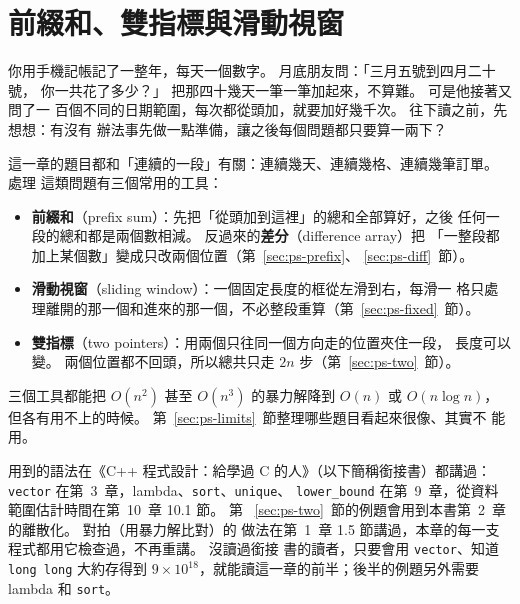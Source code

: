 \chapter{前綴和、雙指標與滑動視窗}
\label{ch:prefix}

\newcommand{\psrow}[4]{%
    \foreach \psv [count=\psi from 0] in {#3} {
        \node[#4] at ({#2 + \psi*0.9},#1) {\psv};
    }%
}

你用手機記帳記了一整年，每天一個數字。 月底朋友問：「三月五號到四月二十號，
你一共花了多少？」 把那四十幾天一筆一筆加起來，不算難。 可是他接著又問了一
百個不同的日期範圍，每次都從頭加，就要加好幾千次。 往下讀之前，先想想：有沒有
辦法事先做一點準備，讓之後每個問題都只要算一兩下？

這一章的題目都和「連續的一段」有關：連續幾天、連續幾格、連續幾筆訂單。 處理
這類問題有三個常用的工具：

\begin{itemize}
\item \textbf{前綴和}（prefix sum）：先把「從頭加到這裡」的總和全部算好，之後
任何一段的總和都是兩個數相減。 反過來的\textbf{差分}（difference array）把
「一整段都加上某個數」變成只改兩個位置（第~\ref{sec:ps-prefix}、
\ref{sec:ps-diff}~節）。
\item \textbf{滑動視窗}（sliding window）：一個固定長度的框從左滑到右，每滑一
格只處理離開的那一個和進來的那一個，不必整段重算（第~\ref{sec:ps-fixed}~節）。
\item \textbf{雙指標}（two pointers）：用兩個只往同一個方向走的位置夾住一段，
長度可以變。 兩個位置都不回頭，所以總共只走 $2n$ 步（第~\ref{sec:ps-two}~節）。
\end{itemize}

三個工具都能把 $O(n^2)$ 甚至 $O(n^3)$ 的暴力解降到 $O(n)$ 或 $O(n \log n)$，
但各有用不上的時候。 第~\ref{sec:ps-limits}~節整理哪些題目看起來很像、其實不
能用。

用到的語法在《C++ 程式設計：給學過 C 的人》（以下簡稱銜接書）都講過：
\texttt{vector} 在第~3~章，lambda、\texttt{sort}、\texttt{unique}、
\texttt{lower\_bound} 在第~9~章，從資料範圍估計時間在第~10~章 10.1 節。 第
~\ref{sec:ps-two}~節的例題會用到本書第~2~章的離散化。 對拍（用暴力解比對）的
做法在第~1~章 1.5 節講過，本章的每一支程式都用它檢查過，不再重講。 沒讀過銜接
書的讀者，只要會用 \texttt{vector}、知道 \texttt{long long} 大約存得到
$9 \times 10^{18}$，就能讀這一章的前半；後半的例題另外需要 lambda 和
\texttt{sort}。

